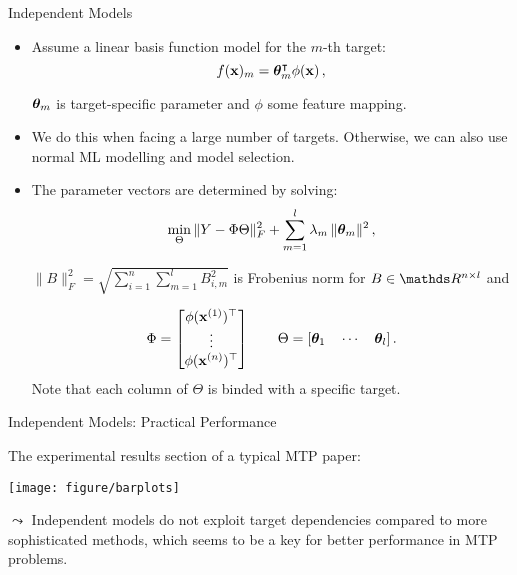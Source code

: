 \documentclass[11pt,compress,t,notes=noshow, xcolor=table]{beamer}
\begin{document}
\begin{frame}{Independent Models}

	\begin{itemize}
	
		\item Assume a linear basis function model for the $m$-th target: 
		\begin{equation*}
			f(\mathbf{x})_m = \bm{\theta}_m^\intercal \phi(\mathbf{x}) \,,
			\label{eq:binrel}
		\end{equation*}

		$\bm{\theta}_m$ is target-specific parameter and $\phi$ some feature mapping.
        \item We do this when facing a large number of targets. Otherwise, we can also use normal ML modelling and model selection.

		\item The parameter vectors are determined by solving: 
		\begin{equation*}
			\label{eq:multiridge}
			\min_\Theta \|Y - \Phi \Theta \|^2_F +  \sum_{m=1}^l \lambda_m \,\|\bm{\theta}_m\|^2 \,,
		\end{equation*}

		$ \| B \|^2_F  = \sqrt{ \sum_{i=1}^n \sum_{m=1}^l B_{i,m}^2 } $ is Frobenius norm for $B \in \R^{n \times l}$ and 
	
		\begin{equation*}
			\label{eq:notation}
			\Phi = \begin{bmatrix} \phi(\mathbf{x}^{(1)})^\top \\ \vdots \\ \phi(\mathbf{x}^{(n)})^\top \end{bmatrix} \qquad \Theta = [\bm{\theta}_1 \quad \cdots \quad \bm{\theta}_l] \,.
		\end{equation*}
        Note that each column of $\Theta$ is binded with a specific target.
	\end{itemize}

\end{frame}

\begin{frame}{Independent Models: Practical Performance}

	The experimental results section of a typical MTP paper: 

	\begin{center}
		\texttt{[image: figure/barplots]} \\
	\end{center}

	$\leadsto$ Independent models do not exploit target dependencies compared to more sophisticated methods, which seems to be a key for better performance in MTP problems.

\end{frame}
\end{document}
